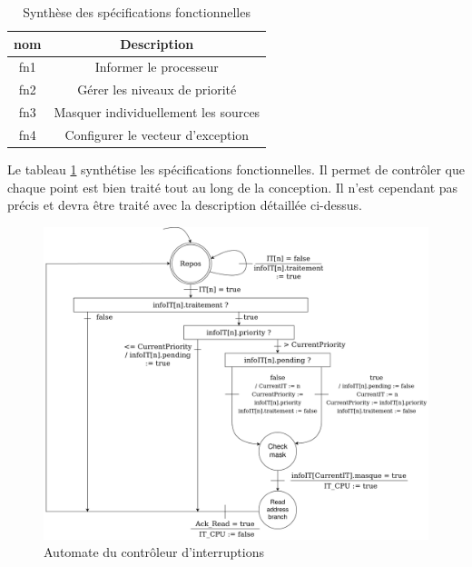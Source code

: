 \begin{table}[H]
	\centering
	\begin{tabular}{|c|c|}
		\hline
		nom & Description                          \\ \hline
		fn1 & Informer le processeur               \\ \hline
		fn2 & Gérer les niveaux de priorité        \\ \hline
		fn3 & Masquer individuellement les sources \\ \hline
		fn4 & Configurer le vecteur d'exception    \\ \hline
	\end{tabular}
	\caption{Synthèse des spécifications fonctionnelles}
	\label{tab:spe_funct}
\end{table}

Le tableau \ref{tab:spe_funct} synthétise les spécifications fonctionnelles.
Il permet de contrôler que chaque point est bien traité tout au long de la conception.
Il n'est cependant pas précis et devra être traité avec la description détaillée ci-dessus.

\begin{figure}[H]
	\centering
	\includegraphics[width=1\linewidth]{figure/spec_fonc_1.png}
	\caption{Automate du contrôleur d'interruptions}
	\label{fig:spec_func_1}
\end{figure}

